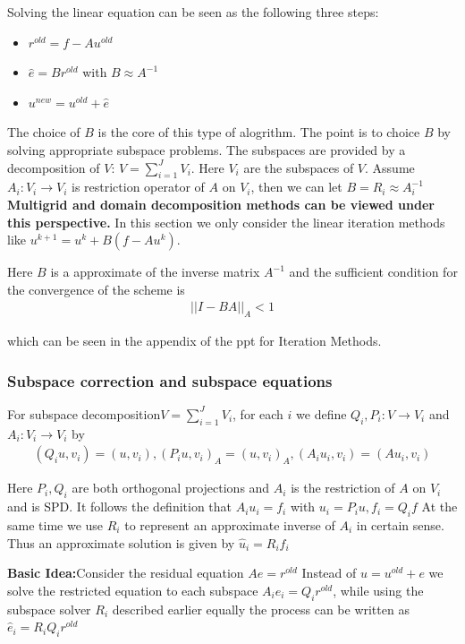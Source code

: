 \documentclass[12pt]{amsart}
\begin{document}
Solving the linear equation can be seen as the following three steps:
\begin{itemize}
	\item $r^{old}=f-Au^{old}$
	\item $\hat e =Br^{old}$ with $B \approx A^{-1}$
	\item $u^{new}=u^{old}+\hat e$
\end{itemize}
The choice of $B$ is the core of this type of alogrithm. The point is to choice $B$ by solving appropriate subspace problems. The subspaces are provided by a decomposition of $V$: $V=\sum_{i=1}^JV_i$. Here $V_i$ are the subspaces of $V$. Assume $A_i:V_i\rightarrow V_i$ is restriction operator of $A$ on $V_i$, then we can let $B=R_i\approx A_i^{-1}$ \textbf{Multigrid and domain decomposition methods can be viewed under this perspective.} In this section we only consider the linear iteration methods like $u^{k+1}=u^{k}+B(f-Au^k)$.

Here $B$ is a approximate of the inverse matrix $A^{-1}$ and the sufficient condition for the convergence of the scheme is
\begin{align*}
\left|\left|I-BA\right|\right|_A<1
\end{align*}

which can be seen in the appendix of the ppt for Iteration Methods.

\subsubsection{Subspace correction and subspace equations}
For subspace decomposition$V=\sum_{i=1}^JV_i$, for each $i$ we define $Q_i,P_i:V\rightarrow V_i$ and $A_i:V_i\rightarrow V_i$ by 
\begin{align*}
(Q_iu,v_i)=(u,v_i),(P_iu,v_i)_A=(u,v_i)_A,(A_iu_i,v_i)=(Au_i,v_i)
\end{align*}

Here $P_i,Q_i$ are both orthogonal projections and $A_i$ is the restriction of $A$ on $V_i$ and is SPD. It follows the definition that $A_iu_i=f_i$ with $u_i=P_iu,f_i=Q_i f$ At the same time we use $R_i$ to represent an approximate inverse of $A_i$ in certain sense. Thus an approximate solution is given by $\hat u_i = R_if_i$

\textbf{Basic Idea:}Consider the residual equation $Ae=r^{old}$ Instead of $u=u^{old}+e$ we solve the restricted equation to each subspace $A_ie_i=Q_ir^{old}$, while using the subspace solver $R_i$ described earlier equally the process can be written as $\hat e_i=R_iQ_ir^{old}$
\end{document}
